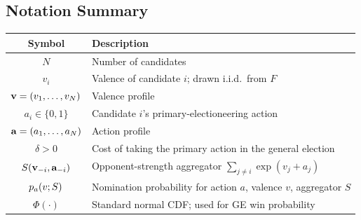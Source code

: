 \documentclass[12pt]{article}
\begin{document}
\subsection*{Notation Summary}

\begin{center}
\begin{tabular}{cl}
    \hline
    \textbf{Symbol} & \textbf{Description} \\
    \hline
    $N$ & Number of candidates \\
    $v_i$ & Valence of candidate $i$; drawn i.i.d.\ from $F$ \\
    $\mathbf v = (v_1,\dots,v_N)$ & Valence profile \\
    $a_i \in \{0,1\}$ & Candidate $i$'s primary-electioneering action \\
    $\mathbf a = (a_1,\dots,a_N)$ & Action profile \\
    $\delta > 0$ & Cost of taking the primary action in the general election \\
    $S\!\left(\mathbf v_{-i},\mathbf a_{-i}\right)$ & Opponent-strength aggregator $\sum_{j\neq i}\exp(v_j+a_j)$ \\
    $p_{a}\!\left(v;S\right)$ & Nomination probability for action $a$, valence $v$, aggregator $S$ \\
    $\Phi(\cdot)$ & Standard normal CDF; used for GE win probability \\
    \hline
\end{tabular}
\end{center}
\end{document}
